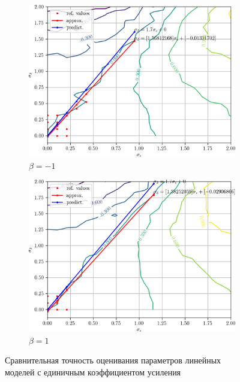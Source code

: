 \begin{figure}[p]
  \begin{subfigure}[b]{\linewidth}
    \centering
    \includegraphics[width=135mm]{fig/linear/param/beta--1_param-accs-diff-approx}
    \caption{\( \beta = -1 \)}
  \end{subfigure}

  \vspace{2\baselineskip}
  \begin{subfigure}[b]{\linewidth}
    \centering
    \includegraphics[width=135mm]{fig/linear/param/beta-1_param-accs-diff-approx}
    \caption{\( \beta = 1 \)}
  \end{subfigure}

  \vspace{\baselineskip}
  \caption{%
    Сравнительная точность оценивания параметров линейных \\
    моделей с единичным коэффициентом усиления
  }\label{fig:comparison_linear_params_beta-1}
\end{figure}

